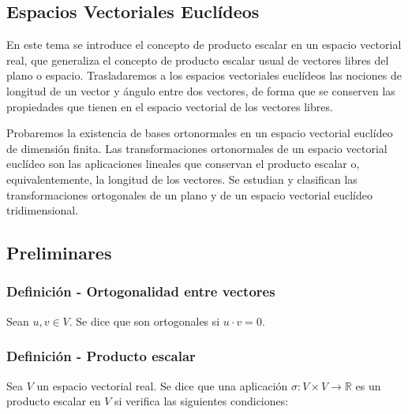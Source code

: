 \documentclass[12pt, a4paper, ones, notitlepage, openany,titlepage]{article}
\begin{document}
\begin{center}
\section{Espacios Vectoriales Euclídeos}
\end{center}

En este tema se introduce el concepto de producto escalar en un espacio vectorial real, que generaliza el concepto de producto escalar usual de vectores libres del plano o espacio. Trasladaremos a los espacios vectoriales euclídeos las nociones de longitud de un vector y ángulo entre dos vectores, de forma que se conserven las propiedades que tienen en el espacio vectorial de los vectores libres.

Probaremos la existencia de bases ortonormales en un espacio vectorial euclídeo de dimensión finita. Las transformaciones ortonormales de un espacio vectorial euclídeo son las aplicaciones lineales que conservan el producto escalar o, equivalentemente, la longitud de los vectores. Se estudian y clasifican las transformaciones ortogonales de un plano y de un espacio vectorial euclídeo tridimensional.

\subsection{Preliminares}

\subsubsection{Definición - Ortogonalidad entre vectores}
\noindent Sean $u,v \in V$. Se dice que son ortogonales si $u\cdot v = 0$.

\subsubsection{Definición - Producto escalar} Sea $V$ un espacio vectorial real. Se dice que una aplicación $\sigma: V \times V \rightarrow \mathbb{R}$ es un producto escalar en $V$ si verifica las siguientes condiciones:
\end{document}
